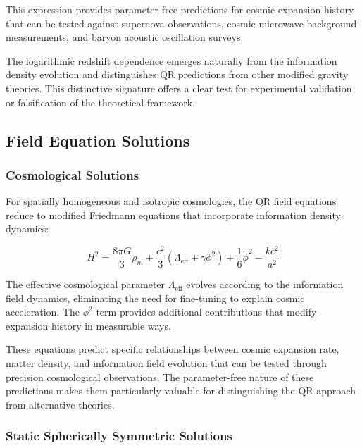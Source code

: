 This expression provides parameter-free predictions for cosmic expansion history that can be tested against supernova observations, cosmic microwave background measurements, and baryon acoustic oscillation surveys.

The logarithmic redshift dependence emerges naturally from the information density evolution and distinguishes QR predictions from other modified gravity theories. This distinctive signature offers a clear test for experimental validation or falsification of the theoretical framework.

\subsection{Field Equation Solutions}
\label{subsec:field-solutions}

\subsubsection{Cosmological Solutions}
\label{subsubsec:cosmological-solutions}

For spatially homogeneous and isotropic cosmologies, the QR field equations reduce to modified Friedmann equations that incorporate information density dynamics:

\begin{equation}
H^2 = \frac{8\pi G}{3}\rho_m + \frac{c^2}{3}(\Lambda_{\text{eff}} + \gamma \phi^2) + \frac{1}{6}\dot{\phi}^2 - \frac{kc^2}{a^2}
\label{eq:qr-friedmann}
\end{equation}

The effective cosmological parameter $\Lambda_{\text{eff}}$ evolves according to the information field dynamics, eliminating the need for fine-tuning to explain cosmic acceleration. The $\phi^2$ term provides additional contributions that modify expansion history in measurable ways.

These equations predict specific relationships between cosmic expansion rate, matter density, and information field evolution that can be tested through precision cosmological observations. The parameter-free nature of these predictions makes them particularly valuable for distinguishing the QR approach from alternative theories.

\subsubsection{Static Spherically Symmetric Solutions}
\label{subsubsec:static-solutions}

